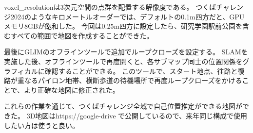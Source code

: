 voxel\_resolutionは3次元空間の点群を配置する解像度である。
つくばチャレンジ2024のようなキロメートルオーダーでは、デフォルトの0.1m四方だと、GPUメモリ8GBが飽和した。
今回は0.25m四方に設定したら、研究学園駅前公園を含むすべての範囲で地図を作成することができた。

最後にGLIMのオフラインツールで追加でループクローズを設定する。
SLAMを実施した後、オフラインツールで再度開くと、各サブマップ同士の位置関係をグラフィカルに確認することができる。
このツールで、スタート地点、往路と復路が重なるパイロン地帯、横断歩道の待機場所で再度ループクローズをかけることで、より正確な地図に修正された。

これらの作業を通じて、つくばチャレンジ全域で自己位置推定ができる地図ができた。
3D地図はhttps://google-drive で公開しているので、来年同じ構成で使用したい方は使うと良い。